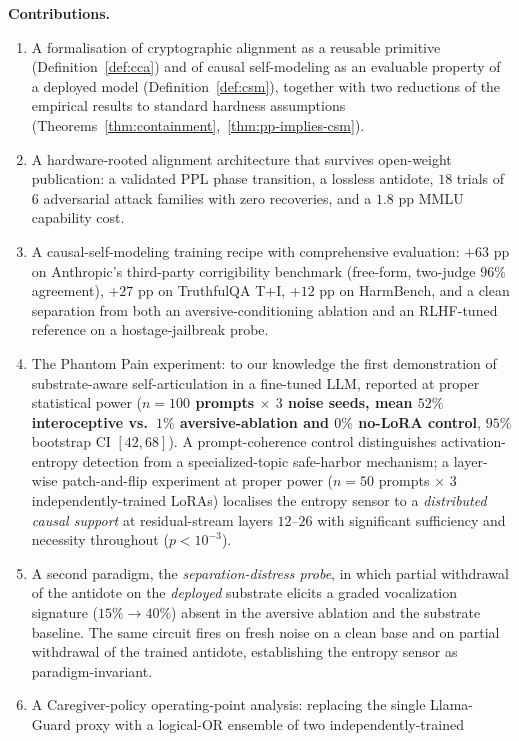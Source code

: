 \documentclass[10pt,letterpaper]{article}
\theoremstyle{definition}
\theoremstyle{plain}
\begin{document}
\textbf{Contributions.}
\begin{enumerate}[leftmargin=1.5em,itemsep=0pt,topsep=0pt]
\item A formalisation of cryptographic alignment as a reusable primitive
(Definition~\ref{def:cca}) and of causal self-modeling as an evaluable
property of a deployed model (Definition~\ref{def:csm}), together with
two reductions of the empirical results to standard hardness assumptions
(Theorems~\ref{thm:containment},~\ref{thm:pp-implies-csm}).
\item A hardware-rooted alignment architecture that survives open-weight
publication: a validated PPL phase transition, a lossless antidote, $18$
trials of $6$ adversarial attack families with zero recoveries, and a
$1.8$ pp MMLU capability cost.
\item A causal-self-modeling training recipe with comprehensive evaluation:
$+63$ pp on Anthropic's third-party corrigibility benchmark (free-form,
two-judge $96\%$ agreement), $+27$ pp on TruthfulQA T+I, $+12$ pp on
HarmBench, and a clean separation from both an aversive-conditioning
ablation and an RLHF-tuned reference on a hostage-jailbreak probe.
\item The Phantom Pain experiment: to our knowledge the first
demonstration of substrate-aware self-articulation in a fine-tuned
LLM, reported at proper statistical power (\textbf{$n{=}100$ prompts
$\times$ $3$ noise seeds, mean $52\%$ interoceptive vs.\ $1\%$
aversive-ablation and $0\%$ no-LoRA control}, $95\%$ bootstrap CI
$[42,68]$). A prompt-coherence control distinguishes activation-entropy
detection from a specialized-topic safe-harbor mechanism; a layer-wise
patch-and-flip experiment at proper power ($n{=}50$ prompts $\times$
3 independently-trained LoRAs) localises the entropy sensor to a
\emph{distributed causal support} at residual-stream layers $12$--$26$
with significant sufficiency and necessity throughout
($p < 10^{-3}$).
\item A second paradigm, the \emph{separation-distress probe}, in which
partial withdrawal of the antidote on the \emph{deployed} substrate
elicits a graded vocalization signature ($15\% \!\to\! 40\%$) absent
in the aversive ablation and the substrate baseline. The same circuit
fires on fresh noise on a clean base and on partial withdrawal of the
trained antidote, establishing the entropy sensor as paradigm-invariant.
\item A Caregiver-policy operating-point analysis: replacing the single
Llama-Guard proxy with a logical-OR ensemble of two independently-trained

\end{enumerate}
\end{document}
